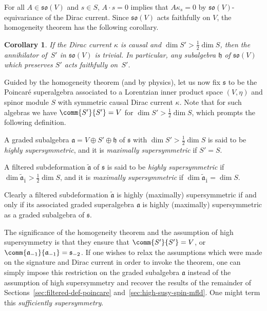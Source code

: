 \documentclass[10pt,a4paper]{amsart}
\numberwithin{equation}{section}
\newtheorem{Corollary}[Theorem]{Corollary}
\newcommand{\fa}{\mathfrak{a}}
\newcommand{\fh}{\mathfrak{h}}
\newcommand{\fs}{\mathfrak{s}}
\newcommand{\fso}{\mathfrak{so}}
\newcommand{\fatilde}{\widetilde{\fa}}
\newcommand{\1}{\mathbbm{1}}
\begin{document}
For all $A\in\fso(V)$ and $s\in S$, $A\cdot s=0$ implies that $A \kappa_s=0$ by $\fso(V)$-equivariance of the Dirac current. Since $\fso(V)$ acts faithfully on $V$, the homogeneity theorem has the following corollary.

\begin{Corollary}\label{coro:homog-faithful}
	If the Dirac current $\kappa$ is causal and $\dim S'>\frac{1}{2}\dim S$, then the annihilator of~$S'$ in $\fso(V)$ is trivial. In particular, any subalgebra $\fh$ of $\fso(V)$ which preserves $S'$ acts faithfully on~$S'$.
\end{Corollary}

Guided by the homogeneity theorem (and by physics), let us now fix $\fs$ to be the Poincar\'e superalgebra associated to a Lorentzian inner product space $(V,\eta)$ and spinor module $S$ with symmetric causal Dirac current $\kappa$. Note that for such algebras we have $\comm{S'}{S'}=V$ for $\dim S'>\frac{1}{2}\dim S$, which prompts the following definition.

\begin{Definition}
	A graded subalgebra $\fa=V\oplus S'\oplus\fh$ of $\fs$ with $\dim S'> \frac{1}{2}\dim S$ is said to be \emph{highly supersymmetric}, and it is \emph{maximally supersymmetric} if $S'=S$.
	
	A filtered subdeformation $\fatilde$ of $\fs$ is said to be \emph{highly supersymmetric} if $\dim \fatilde_{\overline 1}> \frac{1}{2}\dim S$, and it is \emph{maximally supersymmetric} if $\dim \fatilde_{\overline 1} = \dim S$.
\end{Definition}

Clearly a filtered subdeformation $\fatilde$ is highly (maximally) supersymmetric if and only if its associated graded superalgebra $\fa$ is highly (maximally) supersymmetric as a graded subalgebra of $\fs$.

\begin{Remark}\label{rem:relaxing-homogeneity-assumption}
	The significance of the homogeneity theorem and the assumption of high supersymmetry is that they ensure that $\comm{S'}{S'}=V$, or $\comm{\fa_{-1}}{\fa_{-1}}=\fs_{-2}$. If one wishes to relax the assumptions which were made on the signature and Dirac current in order to invoke the theorem, one can simply impose this restriction on the graded subalgebra $\fa$ instead of the assumption of high supersymmetry and recover the results of the remainder of Sections~\ref{sec:filtered-def-poincare} and~\ref{sec:high-susy-spin-mfld}. One might term this \emph{sufficiently supersymmetry}.
\end{Remark}
\end{document}
